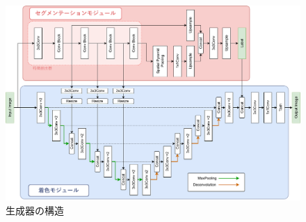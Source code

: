 \documentclass[11pt,dvipdfmx]{ujreport}
\begin{document}
\begin{figure}[tb]
    \centering
    \includegraphics[clip, width=1\columnwidth]{images/generator_architecture-jp_20240114.pdf}
    \caption{生成器の構造}
    \label{fig:generator_architecture}
\end{figure}
\end{document}
